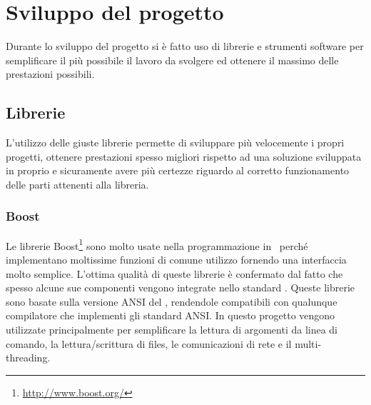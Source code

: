 \chapter{Sviluppo del progetto}
\label{sw_devel}

Durante lo sviluppo del progetto si \`e fatto uso di librerie e strumenti
software per semplificare il pi\`u possibile il lavoro da svolgere ed ottenere
il massimo delle prestazioni possibili. 

\section{Librerie}
L'utilizzo delle giuste librerie permette di sviluppare pi\`u velocemente i
propri progetti, ottenere prestazioni spesso migliori rispetto ad una soluzione
sviluppata in proprio e sicuramente avere pi\`u certezze riguardo al corretto
funzionamento delle parti attenenti alla libreria.

\subsection{Boost}
Le librerie Boost\footnote{\url{http://www.boost.org/}} sono molto usate nella
programmazione in \CC\, perch\'e implementano moltissime funzioni di comune
utilizzo fornendo una interfaccia molto semplice. L'ottima qualit\`a di queste
librerie \`e confermato dal fatto che spesso alcune sue componenti vengono
integrate nello standard \CC. Queste librerie sono basate sulla versione ANSI
del \CC, rendendole compatibili con qualunque compilatore che implementi gli
standard ANSI. In questo progetto vengono utilizzate principalmente per
semplificare la lettura di argomenti da linea di comando, la lettura/scrittura
di files, le comunicazioni di rete e il multi-threading.

